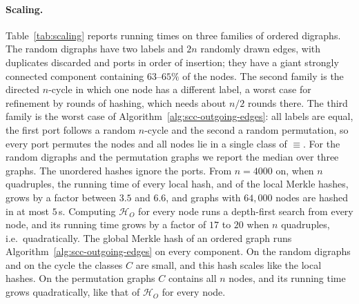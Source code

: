 \documentclass[twoside,leqno]{article}
\newcommand{\HO}{\mathcal{H}_{O}}
\begin{document}
\paragraph{Scaling.} Table~\ref{tab:scaling} reports running times on three families of ordered digraphs. The random digraphs have two labels and $2n$ randomly drawn edges, with duplicates discarded and ports in order of insertion; they have a giant strongly connected component containing $63$--$65\%$ of the nodes. The second family is the directed $n$-cycle in which one node has a different label, a worst case for refinement by rounds of hashing, which needs about $n/2$ rounds there. The third family is the worst case of Algorithm~\ref{alg:scc-outgoing-edges}: all labels are equal, the first port follows a random $n$-cycle and the second a random permutation, so every port permutes the nodes and all nodes lie in a single class of $\equiv$. For the random digraphs and the permutation graphs we report the median over three graphs. The unordered hashes ignore the ports. From $n=4000$ on, when $n$ quadruples, the running time of every local hash, and of the local Merkle hashes, grows by a factor between $3.5$ and $6.6$, and graphs with $64{,}000$ nodes are hashed in at most $5$\,s. Computing $\HO$ for every node runs a depth-first search from every node, and its running time grows by a factor of $17$ to $20$ when $n$ quadruples, i.e.\ quadratically. The global Merkle hash of an ordered graph runs Algorithm~\ref{alg:scc-outgoing-edges} on every component. On the random digraphs and on the cycle the classes $C$ are small, and this hash scales like the local hashes. On the permutation graphs $C$ contains all $n$ nodes, and its running time grows quadratically, like that of $\HO$ for every node.
\end{document}
